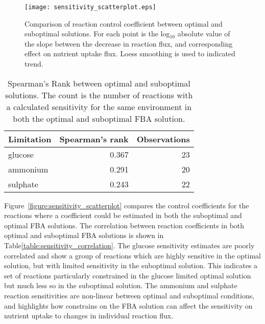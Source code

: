\begin{figure}%
  \centering
  \texttt{[image: sensitivity\_scatterplot.eps]}
  \caption[Comparison of reaction control coefficient between optimal and suboptimal solutions]{Comparison of reaction control coefficient between optimal and suboptimal solutions. For each point is the log$_{10}$ absolute value of the slope between the decrease in reaction flux, and corresponding effect on nutrient uptake flux. Loess smoothing is used to indicated trend. }
  \label{figure:sensitivity_scatterplot}
\end{figure}%

\begin{table}%
  \centering
  \begin{tabular}{l r r}
                                                    \toprule
    Limitation  & Spearman's rank & Observations \\ \midrule
    glucose     & 0.367           & 23           \\
    ammonium    & 0.291           & 20           \\
    sulphate    & 0.243           & 22           \\ \bottomrule
  \end{tabular}
  \caption[Spearman's Rank between optimal and suboptimal solutions]{Spearman's Rank between optimal and suboptimal solutions. The count is the number of reactions with a calculated sensitivity for the same environment in both the optimal and suboptimal FBA solution. }
  \label{table:sensitivity_correlation}
\end{table}%

Figure~\vref{figure:sensitivity_scatterplot} compares the control coefficients for the reactions where a coefficient could be estimated in both the suboptimal and optimal FBA solutions. The correlation between reaction coefficients in both optimal and suboptimal FBA solutions is shown in Table\vref{table:sensitivity_correlation}. The glucose sensitivity estimates are poorly correlated and show a group of reactions which are highly sensitive in the optimal solution, but with limited sensitivity in the suboptimal solution. This indicates a set of reactions particularly constrained in the glucose limited optimal solution but much less so in the suboptimal solution. The ammonium and sulphate reaction sensitivities are non-linear between optimal and suboptimal conditions, and highlights how constrains on the FBA solution can affect the sensitivity on nutrient uptake to changes in individual reaction flux.


